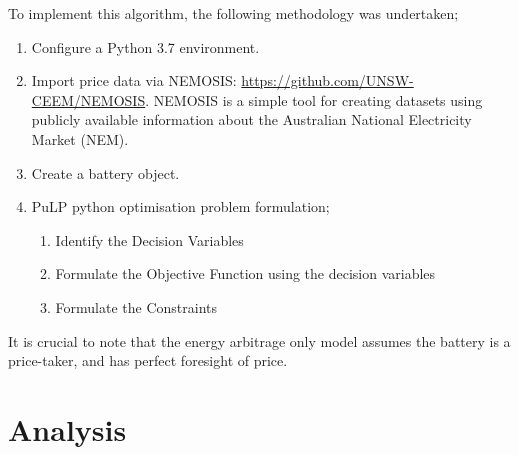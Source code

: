 To implement this algorithm, the following methodology was undertaken;
\begin{enumerate}
    \item Configure a Python 3.7 environment.
    \item Import price data via NEMOSIS:  \url{https://github.com/UNSW-CEEM/NEMOSIS}. NEMOSIS is a simple tool for creating datasets using publicly available information about the Australian National Electricity Market (NEM).
    \item Create a battery object.
    \item PuLP python optimisation problem formulation;
    \begin{enumerate}
        \item Identify the Decision Variables
        \item Formulate the Objective Function using the decision variables
        \item Formulate the Constraints
    \end{enumerate}
\end{enumerate}
It is crucial to note that the energy arbitrage only model assumes the battery is a price-taker, and has perfect foresight of price.
\section{ Analysis }
